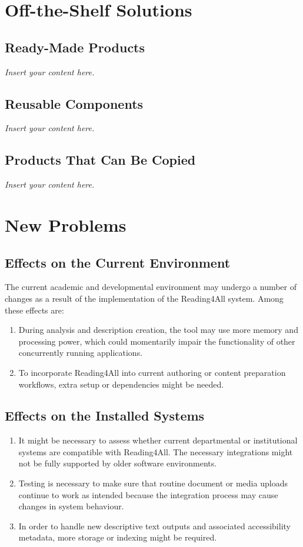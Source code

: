 \documentclass[12pt]{article}
\newcommand{\lips}{\textit{Insert your content here.}}
\begin{document}
\section{Off-the-Shelf Solutions}
\subsection{Ready-Made Products}
\lips
\subsection{Reusable Components}
\lips
\subsection{Products That Can Be Copied}
\lips
\section{New Problems}

\subsection{Effects on the Current Environment}

The current academic and developmental environment may undergo a number of changes as a result of the implementation of the Reading4All system. Among these effects are:

\begin{enumerate}
    \item During analysis and description creation, the tool may use more memory and processing power, which could momentarily impair the functionality of other concurrently running applications.
    \item To incorporate Reading4All into current authoring or content preparation workflows, extra setup or dependencies might be needed.
\end{enumerate}

\subsection{Effects on the Installed Systems}

\begin{enumerate}
    \item It might be necessary to assess whether current departmental or institutional systems are compatible with Reading4All. The necessary integrations might not be fully supported by older software environments.
    \item Testing is necessary to make sure that routine document or media uploads continue to work as intended because the integration process may cause changes in system behaviour.
    \item In order to handle new descriptive text outputs and associated accessibility metadata, more storage or indexing might be required.
\end{enumerate}
\end{document}

